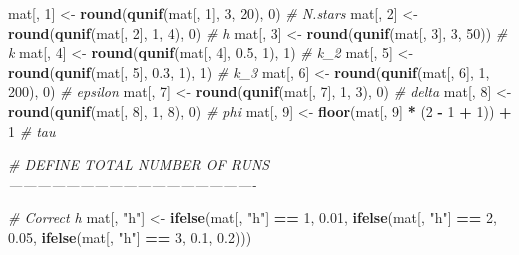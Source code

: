 \documentclass[11pt,]{article}
\newenvironment{Shaded}{\begin{snugshade}}{\end{snugshade}}
\newcommand{\CommentTok}[1]{\textcolor[rgb]{0.56,0.35,0.01}{\textit{#1}}}
\newcommand{\DecValTok}[1]{\textcolor[rgb]{0.00,0.00,0.81}{#1}}
\newcommand{\FloatTok}[1]{\textcolor[rgb]{0.00,0.00,0.81}{#1}}
\newcommand{\KeywordTok}[1]{\textcolor[rgb]{0.13,0.29,0.53}{\textbf{#1}}}
\newcommand{\NormalTok}[1]{#1}
\newcommand{\OperatorTok}[1]{\textcolor[rgb]{0.81,0.36,0.00}{\textbf{#1}}}
\newcommand{\StringTok}[1]{\textcolor[rgb]{0.31,0.60,0.02}{#1}}
\begin{document}
\begin{Shaded}
\begin{Highlighting}[]
\NormalTok{mat[, }\DecValTok{1}\NormalTok{] <-}\StringTok{ }\KeywordTok{round}\NormalTok{(}\KeywordTok{qunif}\NormalTok{(mat[, }\DecValTok{1}\NormalTok{], }\DecValTok{3}\NormalTok{, }\DecValTok{20}\NormalTok{), }\DecValTok{0}\NormalTok{) }\CommentTok{# N.stars}
\NormalTok{mat[, }\DecValTok{2}\NormalTok{] <-}\StringTok{ }\KeywordTok{round}\NormalTok{(}\KeywordTok{qunif}\NormalTok{(mat[, }\DecValTok{2}\NormalTok{], }\DecValTok{1}\NormalTok{, }\DecValTok{4}\NormalTok{), }\DecValTok{0}\NormalTok{) }\CommentTok{# h}
\NormalTok{mat[, }\DecValTok{3}\NormalTok{] <-}\StringTok{ }\KeywordTok{round}\NormalTok{(}\KeywordTok{qunif}\NormalTok{(mat[, }\DecValTok{3}\NormalTok{], }\DecValTok{3}\NormalTok{, }\DecValTok{50}\NormalTok{)) }\CommentTok{# k}
\NormalTok{mat[, }\DecValTok{4}\NormalTok{] <-}\StringTok{ }\KeywordTok{round}\NormalTok{(}\KeywordTok{qunif}\NormalTok{(mat[, }\DecValTok{4}\NormalTok{], }\FloatTok{0.5}\NormalTok{, }\DecValTok{1}\NormalTok{), }\DecValTok{1}\NormalTok{) }\CommentTok{# k_2}
\NormalTok{mat[, }\DecValTok{5}\NormalTok{] <-}\StringTok{ }\KeywordTok{round}\NormalTok{(}\KeywordTok{qunif}\NormalTok{(mat[, }\DecValTok{5}\NormalTok{], }\FloatTok{0.3}\NormalTok{, }\DecValTok{1}\NormalTok{), }\DecValTok{1}\NormalTok{) }\CommentTok{# k_3}
\NormalTok{mat[, }\DecValTok{6}\NormalTok{] <-}\StringTok{ }\KeywordTok{round}\NormalTok{(}\KeywordTok{qunif}\NormalTok{(mat[, }\DecValTok{6}\NormalTok{], }\DecValTok{1}\NormalTok{, }\DecValTok{200}\NormalTok{), }\DecValTok{0}\NormalTok{) }\CommentTok{# epsilon}
\NormalTok{mat[, }\DecValTok{7}\NormalTok{] <-}\StringTok{ }\KeywordTok{round}\NormalTok{(}\KeywordTok{qunif}\NormalTok{(mat[, }\DecValTok{7}\NormalTok{], }\DecValTok{1}\NormalTok{, }\DecValTok{3}\NormalTok{), }\DecValTok{0}\NormalTok{) }\CommentTok{# delta}
\NormalTok{mat[, }\DecValTok{8}\NormalTok{] <-}\StringTok{ }\KeywordTok{round}\NormalTok{(}\KeywordTok{qunif}\NormalTok{(mat[, }\DecValTok{8}\NormalTok{], }\DecValTok{1}\NormalTok{, }\DecValTok{8}\NormalTok{), }\DecValTok{0}\NormalTok{) }\CommentTok{# phi}
\NormalTok{mat[, }\DecValTok{9}\NormalTok{] <-}\StringTok{ }\KeywordTok{floor}\NormalTok{(mat[, }\DecValTok{9}\NormalTok{] }\OperatorTok{*}\StringTok{ }\NormalTok{(}\DecValTok{2} \OperatorTok{-}\StringTok{ }\DecValTok{1} \OperatorTok{+}\StringTok{ }\DecValTok{1}\NormalTok{)) }\OperatorTok{+}\StringTok{ }\DecValTok{1} \CommentTok{# tau}

\CommentTok{# DEFINE TOTAL NUMBER OF RUNS ----------------------------------------------------}

\CommentTok{# Correct h}
\NormalTok{mat[, }\StringTok{"h"}\NormalTok{] <-}\StringTok{ }\KeywordTok{ifelse}\NormalTok{(mat[, }\StringTok{"h"}\NormalTok{] }\OperatorTok{==}\StringTok{ }\DecValTok{1}\NormalTok{, }\FloatTok{0.01}\NormalTok{, }
                     \KeywordTok{ifelse}\NormalTok{(mat[, }\StringTok{"h"}\NormalTok{] }\OperatorTok{==}\StringTok{ }\DecValTok{2}\NormalTok{, }\FloatTok{0.05}\NormalTok{, }
                            \KeywordTok{ifelse}\NormalTok{(mat[, }\StringTok{"h"}\NormalTok{] }\OperatorTok{==}\StringTok{ }\DecValTok{3}\NormalTok{, }\FloatTok{0.1}\NormalTok{, }\FloatTok{0.2}\NormalTok{)))}


\end{Highlighting}
\end{Shaded}
\end{document}
